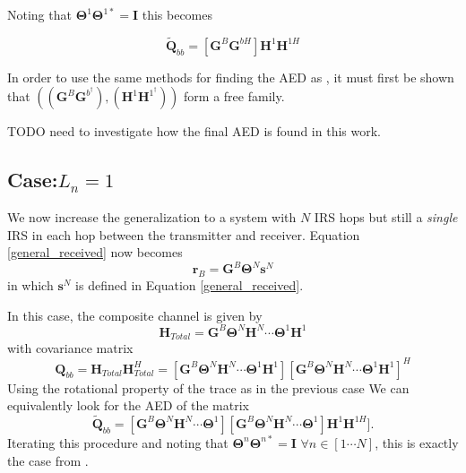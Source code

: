 \documentclass[12pt,a4paper]{report}
\begin{document}
Noting that $\boldsymbol{\Theta}^{1}\boldsymbol{\Theta}^{1*} = \mathbf{I}$ this becomes

\begin{equation}
\tilde{\mathbf{Q}}_{bb} = [\mathbf{G}^{B}\mathbf{G}^{bH}]\mathbf{H}^{1}\mathbf{H}^{1H}
\end{equation}

In order to use the same methods for finding the AED as \cite[Section 4.10]{muller2013applications}, it must first be shown that $\left(\left( \mathbf{G}^{B}\mathbf{G}^{b^\dagger }\right)
,\left( \mathbf{H}^{1}\mathbf{H}^{1^\dagger} \right)
\right)$
form a free family. 
\par
TODO need to investigate how the final AED is found in this work.

\subsection{Case:$L_n=1$}
We now increase the generalization to a system with $N$ IRS hops but still a \emph{single} IRS in each hop between the transmitter and receiver. 
Equation \ref{general_received} now becomes 
\begin{equation}\label{}
\mathbf{r}_{B} =  \mathbf{G}^{B}\boldsymbol{\Theta}^{N}\mathbf{s}^{N}
\end{equation}
in which $\mathbf{s}^{N}$ is defined in Equation \ref{general_received}.

In this case, the composite channel is given by 
\begin{equation}
\mathbf{H}_{Total} = \mathbf{G}^{B}\boldsymbol{\Theta}^{N}\mathbf{H}^{N} \cdots \boldsymbol{\Theta}^{1}\mathbf{H}^{1}
\end{equation}
with covariance matrix 
\begin{equation}\label{polynomial_terms}
\mathbf{Q}_{bb} = \mathbf{H}_{Total}\mathbf{H}_{Total}^H = [\mathbf{G}^{B}\boldsymbol{\Theta}^{N}\mathbf{H}^{N} \cdots \boldsymbol{\Theta}^{1}\mathbf{H}^{1}][\mathbf{G}^{B}\boldsymbol{\Theta}^{N}\mathbf{H}^{N} \cdots \boldsymbol{\Theta}^{1}\mathbf{H}^{1}]^H
\end{equation}
Using the rotational property of the trace as in the previous case
We can equivalently look for the AED of the matrix 
\begin{equation}
\tilde{\mathbf{Q}}_{bb} = [\mathbf{G}^{B}\boldsymbol{\Theta}^{N}\mathbf{H}^{N} \cdots \boldsymbol{\Theta}^{1}][\mathbf{G}^{B}\boldsymbol{\Theta}^{N}\mathbf{H}^{N} \cdots \boldsymbol{\Theta}^{1}]\mathbf{H}^{1}\mathbf{H}^{1H}].
\end{equation}
Iterating this procedure and noting that $\boldsymbol{\Theta}^{n}\boldsymbol{\Theta}^{n*} = \mathbf{I}$ $\forall n \in [1\cdots N]$, this is exactly the case from \cite[Section 4.10]{muller2013applications}.
\end{document}
